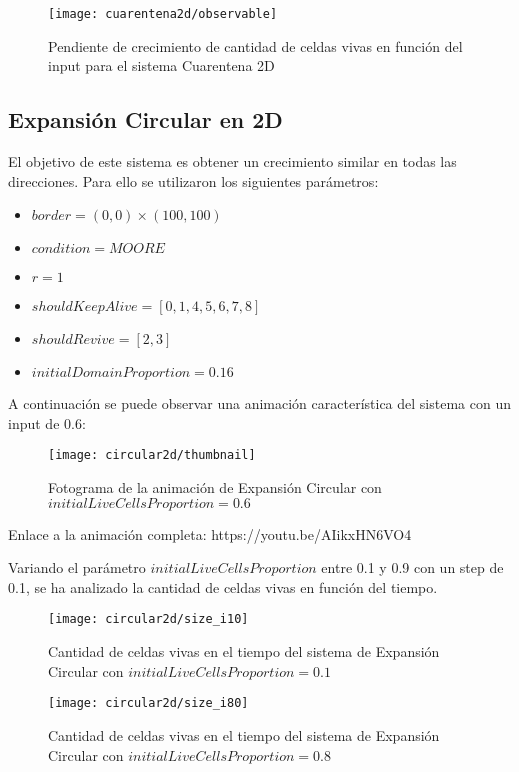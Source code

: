 \begin{figure}[H]
    \centering
    \texttt{[image: cuarentena2d/observable]}
    \caption{Pendiente de crecimiento de cantidad de celdas vivas en función del input para el sistema Cuarentena 2D}
    \label{fig:cuarentena2d_observable}
\end{figure}







\subsection{Expansión Circular en 2D}\label{subsec:expansion-circular-2D}

El objetivo de este sistema es obtener un crecimiento similar en todas las direcciones. Para ello se utilizaron los siguientes parámetros:

\begin{itemize}
    \item $border = (0, 0) \times (100, 100)$
    \item $condition = MOORE$
    \item $r = 1$
    \item $shouldKeepAlive = [0, 1, 4, 5, 6, 7, 8]$
    \item $shouldRevive = [2, 3]$
    \item $initialDomainProportion = 0.16$
\end{itemize}

A continuación se puede observar una animación característica del sistema con un input de 0.6:

\begin{figure}[H]
    \centering
    \texttt{[image: circular2d/thumbnail]}
    \caption{Fotograma de la animación de Expansión Circular con $initialLiveCellsProportion = 0.6$}
    \label{fig:thumbnailcircular2d_i60}
\end{figure}

Enlace a la animación completa: https://youtu.be/AIikxHN6VO4

Variando el parámetro $initialLiveCellsProportion$ entre 0.1 y 0.9 con un step de 0.1, se ha analizado la cantidad de celdas vivas en función
del tiempo.

\begin{figure}[H]
    \centering
    \texttt{[image: circular2d/size\_i10]}
    \caption{Cantidad de celdas vivas en el tiempo del sistema de Expansión Circular con $initialLiveCellsProportion = 0.1$}
    \label{fig:circular2d_i10}
\end{figure}
\begin{figure}[H]
    \centering
    \texttt{[image: circular2d/size\_i80]}
    \caption{Cantidad de celdas vivas en el tiempo del sistema de Expansión Circular con $initialLiveCellsProportion = 0.8$}
    \label{fig:circular2d_i80}
\end{figure}


